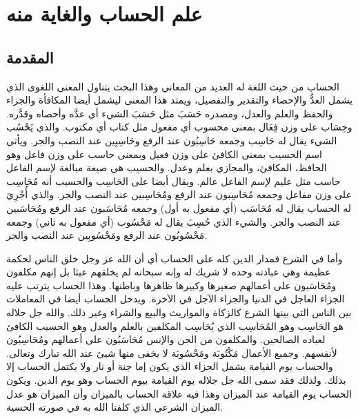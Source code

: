 \chapter{علم الحساب والغاية منه}

\section{المقدمة}

الحساب من حيث اللغة له العديد من المعاني وهذا البحث يتناول المعنى اللغوى الذي يشمل العدُّ والإحصاء والتقدير والتفصيل، ويمتد هذا المعنى ليشمل أيضا المكافأة والجزاء والحفظ والعلم والعدل، ومصدره حَسَبَ مثل حَسَبَ الشيء أي عدَّه وأحصاه وقدَّره. وحِسَاب على وزن فِعَال بمعنى محسوب أي مفعول مثل كتاب أي مكتوب. والذي يَحْسُب الشيء يقال له حَاسِب  وجمعه حَاسِبُون عند الرفع  وحَاسِبِين عند النصب والجر. ويأتي اسم الحسيب بمعنى الكافئ على وزن فعيل وبمعنى حاسب على وزن فاعل وهو الحافظ، المكافئ، والمجازي بعلم وعدل. والحسيب هي صيغة مبالغة لإسم الفاعل حاسب مثل عليم لإسم الفاعل عالم. ويقال أيضا على الحَاسِب والحسيب أنه مُحَاسِب على وزن مفاعل وجمعه مُحَاسِبون عند الرفع ومُحَاسِبين عند النصب والجر. والذي أُجْرِيَ له الحساب يقال له مُحَاسَب (أي مفعول به أول) وجمعه مُحَاسَبون عند الرفع ومُحَاسَبين عند النصب والجر. والشيء الذي حُسِبَ يقال له مَحْسُوب (أي مفعول به ثاني) وجمعه مَحْسُوبُون عند الرفع ومَحْسُوبِين عند النصب والجر. 

وأما في الشرع فمدار الدين كله على الحساب أي أن الله عز وجل خلق الناس لحكمة عظيمة وهي عبادته وحده لا شريك له وإنه سبحانه لم يخلقهم عبثا بل إنهم مكلفون ومُحَاسَبون على أعمالهم صغيرها وكبيرها ظاهرها وباطنها. وهذا الحساب يترتب عليه الجزاء العاجل في الدنيا والجزاء الآجل في الآخرة. ويدخل الحساب أيضا في المعاملات بين الناس التي بينها الشرع كالزكاة والمواريث والبيع والشراء وغير ذلك. والله جل جلاله هو الحَاسِب وهو المُحَاسِب الذي يُحَاسِب المكلفين بالعلم والعدل وهو الحسيب الكافئ لعباده الصالحين. والمكلفون من الجن والإنس مُحَاسَبُون على أعمالهم ومُحَاسِبُون لأنفسهم. وجميع الأعمال مَكْتُوبَة ومَحْسُوبَة لا يخفى منها شيئ عند الله تبارك وتعالى. والحساب يوم القيامة يشمل الجزاء الذي يكون إما جنة أو نار ولا يكتمل الحساب إلا بذلك. ولذلك فقد سمى الله جل جلاله يوم القيامة بيوم الحساب وهو يوم الدين. ويكون الحساب يوم القيامة عند الميزان وهذا فيه علاقة الحساب بالميزان وأن الميزان هو عدل الميزان الشرعي الذي كلفنا الله به في صورته الحسية. 

